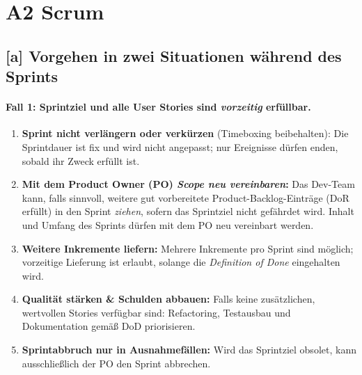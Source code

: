 \documentclass[12pt]{article}
\begin{document}
\section*{A2 Scrum}

\subsection*{[a] Vorgehen in zwei Situationen während des Sprints}

\paragraph{Fall 1: Sprintziel und alle User Stories sind \emph{vorzeitig} erfüllbar.}
\begin{enumerate}
\item \textbf{Sprint nicht verlängern oder verkürzen} (Timeboxing beibehalten): Die Sprintdauer ist fix und wird nicht angepasst; nur Ereignisse dürfen enden, sobald ihr Zweck erfüllt ist. 
\item \textbf{Mit dem Product Owner (PO) \emph{Scope neu vereinbaren}:} Das Dev-Team kann, falls sinnvoll, weitere gut vorbereitete Product-Backlog-Einträge (DoR erfüllt) in den Sprint \emph{ziehen}, sofern das Sprintziel nicht gefährdet wird. Inhalt und Umfang des Sprints dürfen mit dem PO neu vereinbart werden. 
\item \textbf{Weitere Inkremente liefern:} Mehrere Inkremente pro Sprint sind möglich; vorzeitige Lieferung ist erlaubt, solange die \emph{Definition of Done} eingehalten wird. 
\item \textbf{Qualität stärken & Schulden abbauen:} Falls keine zusätzlichen, wertvollen Stories verfügbar sind: Refactoring, Testausbau und Dokumentation gemäß DoD priorisieren. 
\item \textbf{Sprintabbruch nur in Ausnahmefällen:} Wird das Sprintziel obsolet, kann ausschließlich der PO den Sprint abbrechen. 
\end{enumerate}
\end{document}
